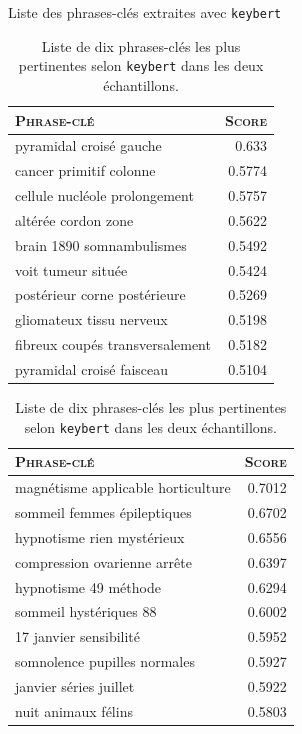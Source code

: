 \begin{frame}{Liste des phrases-clés extraites avec \texttt{keybert}}
\pause
\begin{table}[!htb]
\footnotesize
    \begin{minipage}{.5\linewidth}
      \centering
        \begin{tabular}{l|r}
        \rowcolor[HTML]{FFCCC9} 
\textsc{\textbf{Phrase-clé}} & \cellcolor[HTML]{DAE8FC}\textsc{\textbf{Score}} \\ \hline
pyramidal croisé gauche & 0.633 \\
cancer primitif colonne & 0.5774 \\
cellule nucléole prolongement & 0.5757 \\
altérée cordon zone & 0.5622 \\
brain 1890 somnambulismes & 0.5492 \\
voit tumeur située & 0.5424 \\
postérieur corne postérieure & 0.5269 \\
gliomateux tissu nerveux & 0.5198 \\
fibreux coupés transversalement & 0.5182 \\
pyramidal croisé faisceau & 0.5104 
        \end{tabular}
    \end{minipage}%
    \pause
    \begin{minipage}{.5\linewidth}
            \begin{tabular}{||l|r}
        \rowcolor[HTML]{FFCCC9} 
\textsc{\textbf{Phrase-clé}} & \cellcolor[HTML]{DAE8FC}\textsc{\textbf{Score}} \\ \hline
magnétisme applicable horticulture & 0.7012 \\
sommeil femmes épileptiques & 0.6702 \\
hypnotisme rien mystérieux & 0.6556 \\
compression ovarienne arrête & 0.6397 \\
hypnotisme 49 méthode & 0.6294 \\
sommeil hystériques 88 & 0.6002 \\
17 janvier sensibilité & 0.5952 \\
somnolence pupilles normales & 0.5927 \\
janvier séries juillet & 0.5922 \\
nuit animaux félins & 0.5803
        \end{tabular}
      \centering
    \end{minipage}
    \caption{Liste de dix phrases-clés les plus pertinentes selon \texttt{keybert} dans les deux échantillons.} 
\end{table}



\end{frame}
